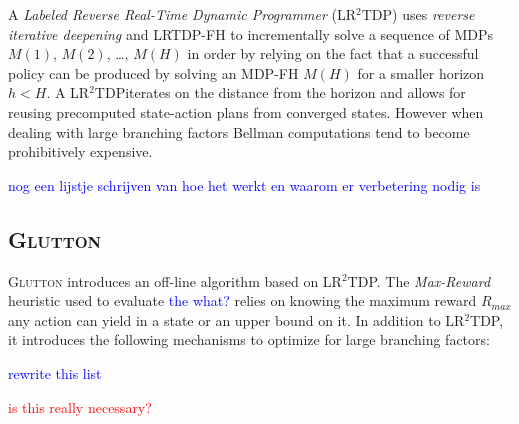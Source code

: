 \documentclass[runningheads,a4paper]{llncs}
\newcommand\myworries[1]{\textcolor{red}{#1}}
\newcommand\todo[1]{\textcolor{blue}{#1}}
\begin{document}

A \emph{Labeled Reverse Real-Time Dynamic Programmer} (LR$^2$TDP) uses \emph{reverse iterative deepening} and LRTDP-FH to incrementally solve a sequence of MDPs $M(1)$, $M(2)$, \ldots , $M(H)$ in order by relying on the fact that a successful policy can be produced by solving an MDP-FH $M(H)$ for a smaller horizon $h < H$. A LR$^2$TDP\@ iterates on the distance from the horizon and allows for reusing precomputed state-action plans from converged states. However when dealing with large branching factors Bellman computations tend to become prohibitively expensive.

\todo{nog een lijstje schrijven van hoe het werkt en waarom er verbetering nodig is}


\subsection{\textsc{Glutton}}

\textsc{Glutton} introduces an off-line algorithm based on LR$^2$TDP. The \emph{Max-Reward} heuristic used to evaluate \todo{the what?} relies on knowing the maximum reward $R_{max}$ any action can yield in a state or an upper bound on it. In addition to LR$^2$TDP, it introduces the following mechanisms to optimize for large branching factors:

\todo{rewrite this list}

\myworries{is this really necessary?}
\end{document}
